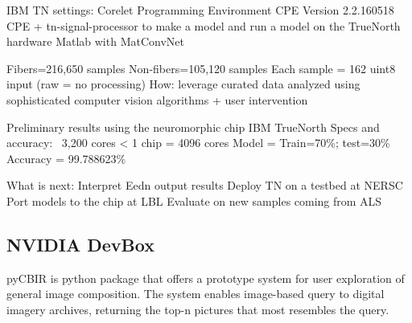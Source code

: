 IBM TN settings:
Corelet Programming Environment CPE Version 2.2.160518
CPE + tn-signal-processor to make a model
and run a model on the TrueNorth hardware
Matlab with MatConvNet

Fibers=216,650 samples
Non-fibers=105,120 samples
Each sample = 162 uint8 input (raw = no processing)
How: leverage curated data analyzed using sophisticated computer vision algorithms + user intervention

Preliminary results using the neuromorphic chip IBM TrueNorth
Specs and accuracy:
~3,200 cores < 1 chip = 4096 cores
Model =
Train=70\%; test=30\%
Accuracy = 99.788623\%

What is next:
Interpret Eedn output results
Deploy TN on a testbed at NERSC
Port models to the chip at LBL
Evaluate on new samples coming from ALS

\subsection{NVIDIA DevBox}

pyCBIR is python package that offers a prototype system for user exploration of general image composition. The system enables image-based query to digital imagery archives, returning the top-n pictures that most resembles the query.




